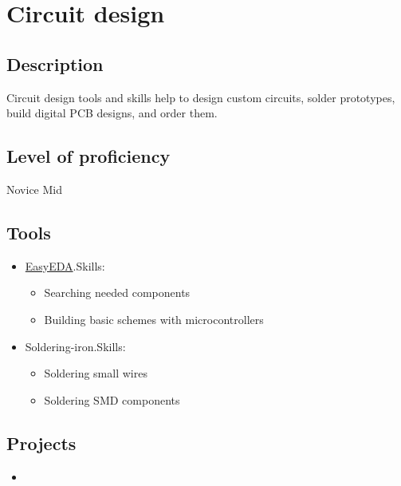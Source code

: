\section{Circuit design}

\subsection{Description}

Circuit design tools and skills help to design custom circuits,
solder prototypes, build digital PCB designs, and order them.

\subsection{Level of proficiency}

Novice Mid

\subsection{Tools}

\begin{itemize}
    \item \href{https://github.com/dkushche/EasyEDA}{EasyEDA}.\break Skills:
    \begin{itemize}
        \item Searching needed components
        \item Building basic schemes with microcontrollers
    \end{itemize}
    \item Soldering-iron.\break Skills:
    \begin{itemize}
        \item Soldering small wires
        \item Soldering SMD components
    \end{itemize}
\end{itemize}

\subsection{Projects}

\begin{itemize}
    \item \noprojects
\end{itemize}

\newpage
